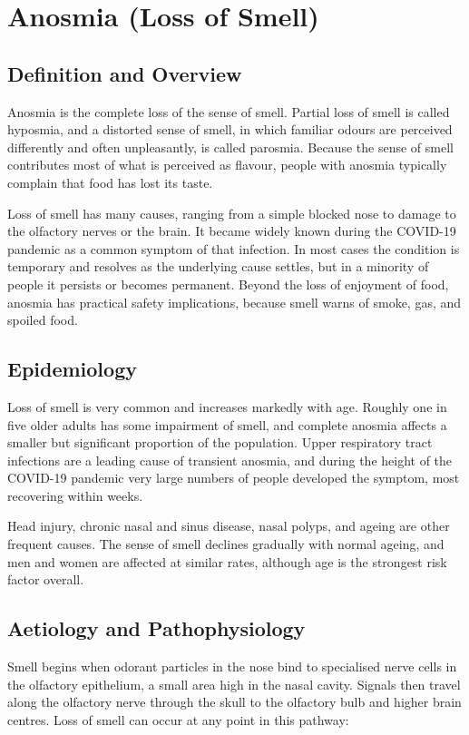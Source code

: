 \chapter{Anosmia (Loss of Smell)}

\section*{Definition and Overview}
Anosmia is the complete loss of the sense of smell. Partial loss of smell is called hyposmia, and a distorted sense of smell, in which familiar odours are perceived differently and often unpleasantly, is called parosmia. Because the sense of smell contributes most of what is perceived as flavour, people with anosmia typically complain that food has lost its taste.

Loss of smell has many causes, ranging from a simple blocked nose to damage to the olfactory nerves or the brain. It became widely known during the COVID-19 pandemic as a common symptom of that infection. In most cases the condition is temporary and resolves as the underlying cause settles, but in a minority of people it persists or becomes permanent. Beyond the loss of enjoyment of food, anosmia has practical safety implications, because smell warns of smoke, gas, and spoiled food.

\section*{Epidemiology}
Loss of smell is very common and increases markedly with age. Roughly one in five older adults has some impairment of smell, and complete anosmia affects a smaller but significant proportion of the population. Upper respiratory tract infections are a leading cause of transient anosmia, and during the height of the COVID-19 pandemic very large numbers of people developed the symptom, most recovering within weeks.

Head injury, chronic nasal and sinus disease, nasal polyps, and ageing are other frequent causes. The sense of smell declines gradually with normal ageing, and men and women are affected at similar rates, although age is the strongest risk factor overall.

\section*{Aetiology and Pathophysiology}
Smell begins when odorant particles in the nose bind to specialised nerve cells in the olfactory epithelium, a small area high in the nasal cavity. Signals then travel along the olfactory nerve through the skull to the olfactory bulb and higher brain centres. Loss of smell can occur at any point in this pathway:

